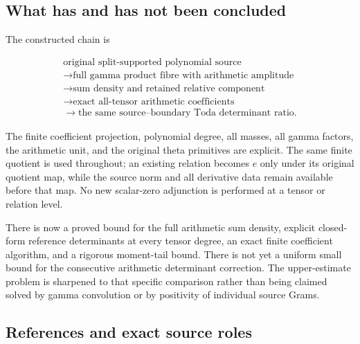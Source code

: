 \subsection[\hspace{0.4em}What has and has not been
concluded]{What has and has not been
concluded}\label{gammad-what-has-and-has-not-been-concluded}

The constructed chain is

\[
\begin{gathered}
\text{original split-supported polynomial source}\\
\longrightarrow\text{full gamma product fibre with arithmetic amplitude}\\
\longrightarrow\text{sum density and retained relative component}\\
\longrightarrow\text{exact all-tensor arithmetic coefficients}
\\
\longrightarrow\text{the same source--boundary Toda determinant ratio}.
\end{gathered}
\]

The finite coefficient projection, polynomial degree, all masses, all
gamma factors, the arithmetic unit, and the original theta primitives
are explicit. The same finite quotient is used throughout; an existing
relation becomes \(e\) only under its original quotient map, while the
source norm and all derivative data remain available before that map. No
new scalar-zero adjunction is performed at a tensor or relation level.

There is now a proved bound for the full arithmetic sum density,
explicit closed-form reference determinants at every tensor degree, an
exact finite coefficient algorithm, and a rigorous moment-tail bound.
There is not yet a uniform small bound for the consecutive arithmetic
determinant correction. The upper-estimate problem is sharpened to that
specific comparison rather than being claimed solved by gamma
convolution or by positivity of individual source Grams.

\subsection[\hspace{0.4em}References and exact source
roles]{References and exact source
roles}\label{gammad-references-and-exact-source-roles}

